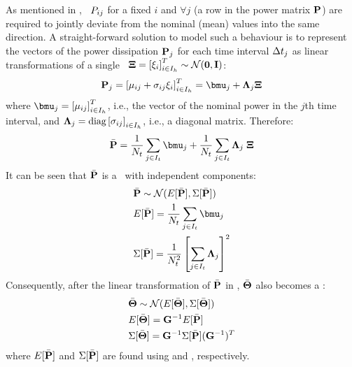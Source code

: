 As mentioned in , \rvs\ $P_{ij}$ for a fixed $i$ and $\forall j$ (a row in the power matrix $\mathbf{P}$) are required to jointly deviate from the nominal (mean) values into the same direction. A straight-forward solution to model such a behaviour is to represent the vectors of the power dissipation $\mathbf{P}_j$ for each time interval $\Delta t_j$ as linear transformations of a single \msnrv\ $\mathbf{\Xi} = \left[\xi_i\right]^T_{i \in I_h} \sim \mathcal{N}(\mathbf{0}, \mathbf{I})$:
\begin{equation} \equlabel{power-rv}
  \vpower_j = \vector{\mean{ij} + \deviation{ij} \stdnormal_i}_{i \in \nodeindex} = \vmean{j} + \ddeviation{j} \vstdnormal
\end{equation}
where $\vmean{j} = \vector{\mean{ij}}_{i \in \nodeindex}$, i.e., the vector of the nominal power in the $j$th time interval, and $\mathbf{\Lambda}_{j} = \text{diag}\left[\sigma_{ij}\right]_{i \in I_h}$, i.e., a diagonal matrix. Therefore:
\[
  \a{\vpower} = \frac{1}{\stepcount} \sum_{j \in \timeindex} \vmean{j} + \frac{1}{\stepcount} \sum_{j \in \timeindex} \ddeviation{j} \; \vstdnormal
\]
It can be seen that $\bar{\mathbf{P}}$ is a \mnrv\ with independent components:
\begin{align}
  & \a{\vpower} \sim \normal(\expectation{\a{\vpower}}, \covariance{\a{\vpower}}) \nonumber \\
  & \expectation{\a{\vpower}} = \frac{1}{\stepcount} \sum_{j \in \timeindex} \vmean{j} \equlabel{steady-power-mean} \\
  & \covariance{\a{\vpower}} = \frac{1}{\stepcount^2} \left[ \sum_{j \in \timeindex} \ddeviation{j} \right]^2 \equlabel{steady-power-covariance}
\end{align}
Consequently, after the linear transformation of $\bar{\mathbf{P}}$ in , $\bar{\mathbf{\Theta}}$ also becomes a \mnrv:
\begin{align*}
  & \bar{\mathbf{\Theta}} \sim \mathcal{N}(E[\bar{\mathbf{\Theta}}], \Sigma[\bar{\mathbf{\Theta}}]) \\
  & E[\bar{\mathbf{\Theta}}] = \mathbf{G}^{-1} E[\bar{\mathbf{P}}] \\
  & \Sigma[\bar{\mathbf{\Theta}}] = \mathbf{G}^{-1} \Sigma[\bar{\mathbf{P}}] (\mathbf{G}^{-1})^T
\end{align*}
where $E[\bar{\mathbf{P}}]$ and $\Sigma[\bar{\mathbf{P}}]$ are found using  and , respectively.
